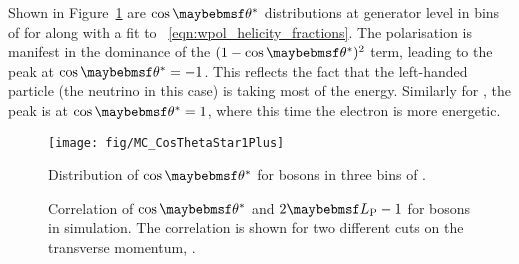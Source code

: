 Shown in Figure~\ref{fig:wpol_costheta} are $\cos\thetastar$ distributions at
generator level in bins of \PtW for \PWp along with a fit to
\eqn~\ref{eqn:wpol_helicity_fractions}. The polarisation is manifest in the
dominance of the $(1-\cos\thetastar)^2$ term, leading to the peak at
$\cos\thetastar = -1$. This reflects the fact that the left-handed particle (the
neutrino in this case) is taking most of the energy. Similarly for \PWm, the
peak is at $\cos\thetastar = 1$, where this time the electron is more energetic.

\begin{figure}
\centering
\texttt{[image: fig/MC\_CosThetaStar1Plus]}
\caption{Distribution of $\cos\thetastar$ for \PWp bosons in three bins of \PtW.}
\label{fig:wpol_costheta}
\end{figure}

\begin{figure}
\centering
{}\quad
\subfloat[[$\PtW > \unit{400}{\GeV}$]{
  \label{fig:wpol_costheta_corr400}\texttt{[image: fig/LP\_corr400]}}\quad
\caption{Correlation of $\cos\thetastar$ and $2\LP - 1$ for \PW bosons in
  simulation. The correlation is shown for two different cuts on the transverse
  momentum, \PtW.}
\label{fig:wpol_costheta_corr}
\end{figure}

